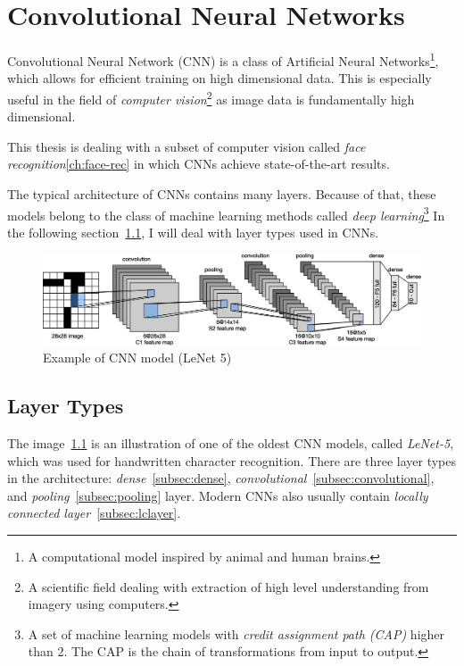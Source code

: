 \chapter{Convolutional Neural Networks}\label{ch:cnn}
Convolutional Neural Network (CNN) is a class of Artificial Neural Networks\footnote{A computational model inspired by
animal and human brains.}, which allows for efficient training on high dimensional data.
This is especially useful in the field of \textit{computer vision}\footnote{A scientific field dealing with extraction
of high level understanding from imagery using computers.} as image data is fundamentally high dimensional.

This thesis is dealing with a subset of computer vision called \textit{face recognition}\ref{ch:face-rec} in which CNNs
achieve state-of-the-art results.

The typical architecture of CNNs contains many layers.
Because of that, these models belong to the class of machine learning methods called
\textit{deep learning}\footnote{A set of machine learning models with \textit{credit assignment path (CAP)} higher than 2.
The CAP is the chain of transformations from input to output.}
In the following section~\ref{sec:layer-types}, I will deal with layer types used in CNNs.

\begin{figure}[H]
    \centering
    \includegraphics[width=\columnwidth]{images/cnn/lenet.eps}
    \caption{Example of CNN model (LeNet 5)~\cite{LeNet5}}
    \label{fig:cnn}
\end{figure}

\section{Layer Types}\label{sec:layer-types}
The image~\ref{fig:cnn} is an illustration of one of the oldest CNN models, called \textit{LeNet-5}, which was used for
handwritten character recognition.
There are three layer types in the architecture: \textit{dense}~\ref{subsec:dense},
\textit{convolutional}~\ref{subsec:convolutional}, and \textit{pooling}~\ref{subsec:pooling} layer.
Modern CNNs also usually contain \textit{locally connected layer}~\ref{subsec:lclayer}.

